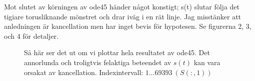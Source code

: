 \documentclass[a4paper]{article}
\begin{document}



Mot slutet av körningen av ode45 händer något konstigt; s(t) slutar följa det
tigiare torusliknande mönstret och drar iväg i en rät linje. Jag misstänker att
anledningen är kancellation men har inget bevis för hypotesen. Se figurerna 2,
3, och 4 för detaljer.

\begin{figure}[H]
  \caption{Så här ser det ut om vi plottar hela resultatet av ode45. Det
    annorlunda och troligtvis felaktiga beteendet av $s(t)$ kan vara orsakat av
  kancellation. Indexintervall: $1\ldots69393\ (S(:,1))$}
  \begin{centering}
    \setlength\fboxsep{0pt}
    \setlength\fboxrule{0.5pt}

\end{centering}
\end{figure}
\end{document}
